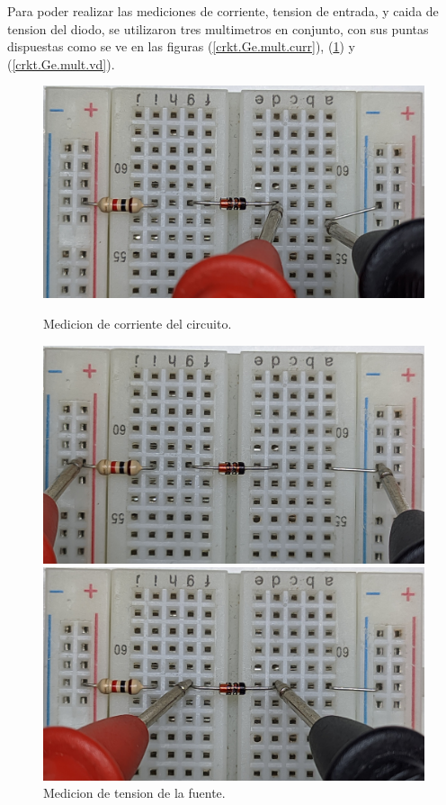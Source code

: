 \documentclass[chaptersright]{informeutn}
\begin{document}
      Para poder realizar las mediciones de corriente, tension de entrada, y caida de tension del diodo, se utilizaron
      tres multimetros en conjunto, con sus puntas dispuestas como se ve en las figuras (\ref{crkt.Ge.mult.curr}),
      (\ref{crkt.Ge.mult.vi}) y (\ref{crkt.Ge.mult.vd}).
      \begin{figure}[H]
        \centering
        \begin{minipage}{0.3\textwidth}
          \includegraphics[angle=180, width=1\textwidth]{pictures/prot_crkt-2_curr.jpg}
          \caption{Medicion de corriente del circuito.}
          \label{crkt.Ge.mult.curr}
        \end{minipage}
        \begin{minipage}{0.3\textwidth}
          \includegraphics[angle=180, width=1\textwidth]{pictures/prot_crkt-2_vi.jpg}
          \caption{Medicion de tension de la fuente.}
          \label{crkt.Ge.mult.vi}
        \end{minipage}
        \begin{minipage}{0.3\textwidth}
          \includegraphics[angle=180, width=1\textwidth]{pictures/prot_crkt-2_vd.jpg}

\end{minipage}
\end{figure}
\end{document}
